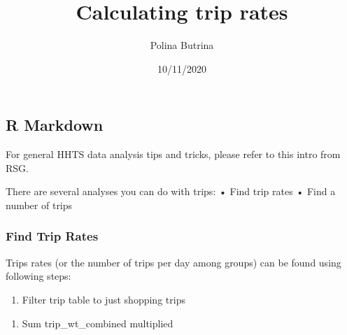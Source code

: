 \documentclass[
]{article}
\title{Calculating trip rates}
\author{Polina Butrina}
\date{10/11/2020}
\newenvironment{Shaded}{\begin{snugshade}}{\end{snugshade}}
\newcommand{\KeywordTok}[1]{\textcolor[rgb]{0.13,0.29,0.53}{\textbf{#1}}}
\newcommand{\NormalTok}[1]{#1}
\newcommand{\OperatorTok}[1]{\textcolor[rgb]{0.81,0.36,0.00}{\textbf{#1}}}
\newcommand{\StringTok}[1]{\textcolor[rgb]{0.31,0.60,0.02}{#1}}
\providecommand{\tightlist}{%
  \setlength{\itemsep}{0pt}\setlength{\parskip}{0pt}}
\begin{document}
\maketitle

\hypertarget{r-markdown}{%
\subsection{R Markdown}\label{r-markdown}}

For general HHTS data analysis tips and tricks, please refer to this
intro from RSG.

There are several analyses you can do with trips: • Find trip rates •
Find a number of trips

\hypertarget{find-trip-rates}{%
\subsubsection{Find Trip Rates}\label{find-trip-rates}}

Trips rates (or the number of trips per day among groups) can be found
using following steps:

\begin{enumerate}
\def\labelenumi{\arabic{enumi}.}
\tightlist
\item
  Filter trip table to just shopping trips
\end{enumerate}

\begin{Shaded}
\end{Shaded}

\begin{enumerate}
\def\labelenumi{\arabic{enumi}.}
\setcounter{enumi}{1}
\tightlist
\item
  Sum trip\_wt\_combined multiplied
\end{enumerate}

\begin{Shaded}
\end{Shaded}
\end{document}

